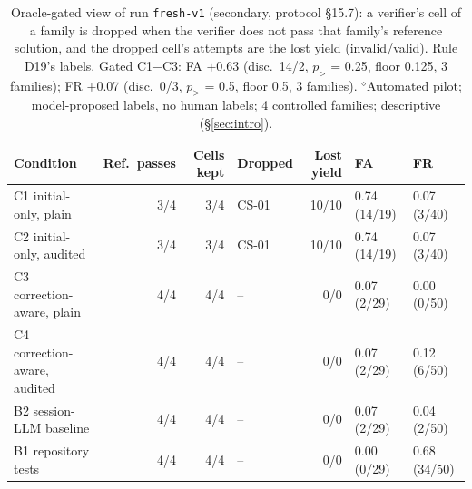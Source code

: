 \begin{table}[t]\centering\footnotesize
\caption{Oracle-gated view of run \texttt{fresh-v1} (secondary, protocol \S15.7): a verifier's cell of a family is dropped when the verifier does not pass that family's reference solution, and the dropped cell's attempts are the lost yield (invalid/valid). Rule D19's labels. Gated C1$-$C3: FA \ensuremath{+}0.63 (disc.\ 14/2, $p_{>}$ = 0.25, floor 0.125, 3 families); FR \ensuremath{+}0.07 (disc.\ 0/3, $p_{>}$ = 0.5, floor 0.5, 3 families). $^{\diamond}$Automated pilot; model-proposed labels, no human labels; 4 controlled families; descriptive (\S\ref{sec:intro}).}\label{tab:fresh-oracle}
\begin{tabular}{lrrlrll}\toprule Condition & Ref.\ passes & Cells kept & Dropped & Lost yield & FA & FR \\\midrule
C1 initial-only, plain & 3/4 & 3/4 & CS-01 & 10/10 & 0.74 (14/19) & 0.07 (3/40) \\
C2 initial-only, audited & 3/4 & 3/4 & CS-01 & 10/10 & 0.74 (14/19) & 0.07 (3/40) \\
C3 correction-aware, plain & 4/4 & 4/4 & -- & 0/0 & 0.07 (2/29) & 0.00 (0/50) \\
C4 correction-aware, audited & 4/4 & 4/4 & -- & 0/0 & 0.07 (2/29) & 0.12 (6/50) \\
B2 session-LLM baseline & 4/4 & 4/4 & -- & 0/0 & 0.07 (2/29) & 0.04 (2/50) \\
B1 repository tests & 4/4 & 4/4 & -- & 0/0 & 0.00 (0/29) & 0.68 (34/50) \\
\bottomrule\end{tabular}\end{table}
